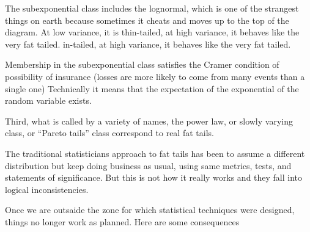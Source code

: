 \documentclass[
]{book}
\begin{document}
The subexponential class includes the lognormal, which is one
of the strangest things on earth because sometimes it cheats
and moves up to the top of the diagram. At low variance, it is
thin-tailed, at high variance, it behaves like the very fat tailed.
in-tailed, at high variance, it behaves like the very fat tailed.

Membership in the subexponential class satisfies the Cramer
condition of possibility of insurance (losses are more likely to
come from many events than a single one)
Technically it means that the expectation of
the exponential of the random variable exists.

Third, what is called by a variety of names, the power law, or slowly
varying class, or ``Pareto tails'' class correspond to real fat tails.

The traditional statisticians approach to fat tails has been
to assume a different distribution but keep doing business as
usual, using same metrics, tests, and statements of significance.
But this is not how it really works and they fall into logical
inconsistencies.

Once we are outsaide the zone for which statistical techniques were designed,
things no longer work as planned.
Here are some consequences
\end{document}
